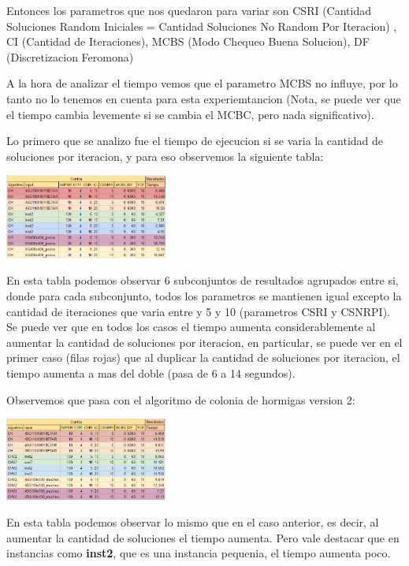Entonces los parametros que nos quedaron para variar son CSRI (Cantidad Soluciones Random Iniciales = Cantidad Soluciones No Random Por Iteracion) , CI (Cantidad de Iteraciones), MCBS (Modo Chequeo Buena Solucion), DF (Discretizacion Feromona)

A la hora de analizar el tiempo vemos que el parametro MCBS no influye, por lo tanto no lo tenemos en cuenta para esta experiemtancion (Nota, se puede ver que el tiempo cambia levemente si se cambia el MCBC, pero nada significativo). 

Lo primero que se analizo fue el tiempo de ejecucion si se varia la cantidad de soluciones por iteracion, y para eso observemos la siguiente tabla:

\begin{center}
\includegraphics[width=0.4\textwidth]{imagenes/tabla1}
\end{center}

En esta tabla podemos observar 6 subconjuntos de resultados agrupados entre si, donde para cada subconjunto, todos los parametros se mantienen igual excepto la cantidad de iteraciones que varia entre y 5 y 10 (parametros CSRI y CSNRPI). Se puede ver que en todos los casos el tiempo aumenta considerablemente al aumentar la cantidad de soluciones por iteracion, en particular, se puede ver en el primer caso (filas rojas) que al duplicar la cantidad de soluciones por iteracion, el tiempo aumenta a mas del doble (pasa de 6 a 14 segundos).

Observemos que pasa con el algoritmo de colonia de hormigas version 2:

\begin{center}
\includegraphics[width=0.4\textwidth]{imagenes/tabla2}
\end{center}

En esta tabla podemos observar lo mismo que en el caso anterior, es decir, al aumentar la cantidad de soluciones el tiempo aumenta. Pero vale destacar que en instancias como \textbf{inst2}, que es una instancia pequenia, el tiempo aumenta poco.

